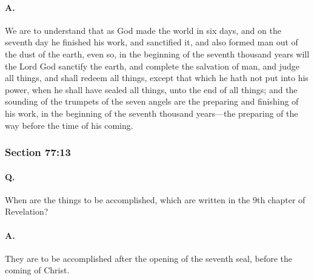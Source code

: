 		\paragraph{A.}
		
			We are to understand that as God made the world in six days, and on the seventh day he finished his work, and sanctified it, and also formed man out of the dust of the earth, even so, in the beginning of the seventh thousand years will the Lord God sanctify the earth, and complete the salvation of man, and judge all things, and shall redeem all things, except that which he hath not put into his power, when he shall have sealed all things, unto the end of all things; and the sounding of the trumpets of the seven angels are the preparing and finishing of his work, in the beginning of the seventh thousand years—the preparing of the way before the time of his coming.


	\subsubsection{Section 77:13} %
		\label{DC77-13}

		\paragraph{Q.}
		
			When are the things to be accomplished, which are written in the 9th chapter of Revelation?

		\paragraph{A.}
		
			They are to be accomplished after the opening of the seventh seal, before the coming of Christ.


